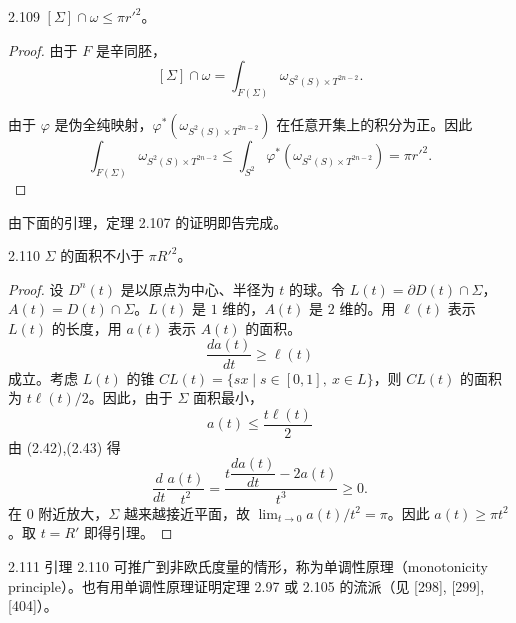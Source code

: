 \begin{lemma*}{2.109}
  $[\Sigma]\cap\omega\le\pi r'^2$。
\end{lemma*}

\begin{proof}
  由于 $F$ 是辛同胚，
  \[
    [\Sigma]\cap\omega=\int_{F(\Sigma)}\omega_{S^2(S)\times T^{2n-2}} .
  \]

  由于 $\varphi$ 是伪全纯映射，$\varphi^*(\omega_{S^2(S)\times T^{2n-2}})$ 在任意开集上的积分为正。因此
  \[
    \int_{F(\Sigma)}\omega_{S^2(S)\times T^{2n-2}}
    \le\int_{S^2}\varphi^*(\omega_{S^2(S)\times T^{2n-2}})=\pi r'^2 .
  \]
\end{proof}

由下面的引理，定理 2.107 的证明即告完成。

\begin{lemma*}{2.110}
  $\Sigma$ 的面积不小于 $\pi R'^2$。
\end{lemma*}

\begin{proof}
  设 $D^n(t)$ 是以原点为中心、半径为 $t$ 的球。令 $L(t)=\partial D(t)\cap\Sigma$，$A(t)=D(t)\cap\Sigma$。$L(t)$ 是 $1$ 维的，$A(t)$ 是 $2$ 维的。用 $\ell(t)$ 表示 $L(t)$ 的长度，用 $a(t)$ 表示 $A(t)$ 的面积。
  \begin{equation}
    \frac{da(t)}{dt}\ge\ell(t) \tag{2.42}
  \end{equation}
  成立。考虑 $L(t)$ 的锥 $CL(t)=\{sx\mid s\in[0,1],\ x\in L\}$，则 $CL(t)$ 的面积为 $t\ell(t)/2$。因此，由于 $\Sigma$ 面积最小，
  \begin{equation}
    a(t)\le\frac{t\ell(t)}{2} \tag{2.43}
  \end{equation}
  由 (2.42),(2.43) 得
  \[
    \frac{d}{dt}\frac{a(t)}{t^2}=\frac{t\dfrac{da(t)}{dt}-2a(t)}{t^3}\ge0 .
  \]
  在 $0$ 附近放大，$\Sigma$ 越来越接近平面，故 $\lim_{t\to0}a(t)/t^2=\pi$。因此 $a(t)\ge\pi t^2$。取 $t=R'$ 即得引理。
\end{proof}

\begin{remark}{2.111}
  引理 2.110 可推广到非欧氏度量的情形，称为单调性原理（monotonicity principle）。也有用单调性原理证明定理 2.97 或 2.105 的流派（见 [298], [299], [404]）。
\end{remark}


